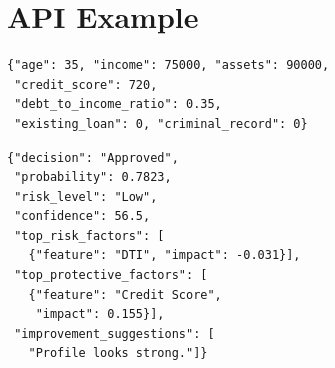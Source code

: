 \documentclass[journal]{IEEEtran}
\begin{document}
\section{API Example}

\begin{lstlisting}[caption={POST /predict Request}]
{"age": 35, "income": 75000, "assets": 90000,
 "credit_score": 720,
 "debt_to_income_ratio": 0.35,
 "existing_loan": 0, "criminal_record": 0}
\end{lstlisting}

\begin{lstlisting}[caption={Response}]
{"decision": "Approved",
 "probability": 0.7823,
 "risk_level": "Low",
 "confidence": 56.5,
 "top_risk_factors": [
   {"feature": "DTI", "impact": -0.031}],
 "top_protective_factors": [
   {"feature": "Credit Score",
    "impact": 0.155}],
 "improvement_suggestions": [
   "Profile looks strong."]}
\end{lstlisting}
\end{document}
